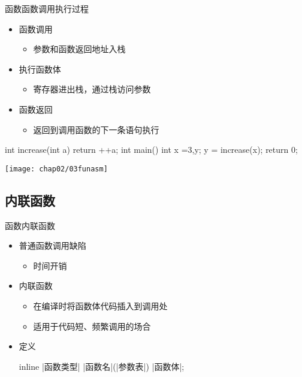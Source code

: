 \begin{frame}[fragile]{函数}{函数调用执行过程}
  \begin{itemize}
  \item 函数调用
    \begin{itemize}
    \item 参数和函数返回地址入栈
    \end{itemize}
  \item 执行函数体
    \begin{itemize}
    \item 寄存器进出栈，通过栈访问参数
    \end{itemize}
  \item 函数返回
    \begin{itemize}
    \item 返回到调用函数的下一条语句执行
    \end{itemize}
  \end{itemize}
  \begin{center}
    \begin{minipage}{0.3\linewidth}
      \begin{cppcode}
int increase(int a)
{
  return ++a;
}
int main()
{
  int x =3,y;
  y = increase(x);
  return 0;
}
      \end{cppcode}
    \end{minipage}
    \begin{minipage}{0.6\linewidth}
      \texttt{[image: chap02/03funasm]}
    \end{minipage}
  \end{center}
\end{frame}
\subsection[内联函数]{内联函数}
\begin{frame}[fragile]{函数}{内联函数}
  \stretchon
  \begin{itemize}
  \item 普通函数调用缺陷
    \begin{itemize}
    \item 时间开销
    \end{itemize}
  \item 内联函数
    \begin{itemize}
    \item 在编译时将函数体代码插入到调用处
    \item 适用于代码短、频繁调用的场合
    \end{itemize}
  \item 定义\\[2ex]
      \begin{minipage}{0.6\linewidth}
        \begin{cpptt}
inline |函数类型| |函数名|(|参数表|)
{
    |函数体|;
}
       \end{cpptt}
      \end{minipage}
  \end{itemize}
  \stretchoff
\end{frame}

